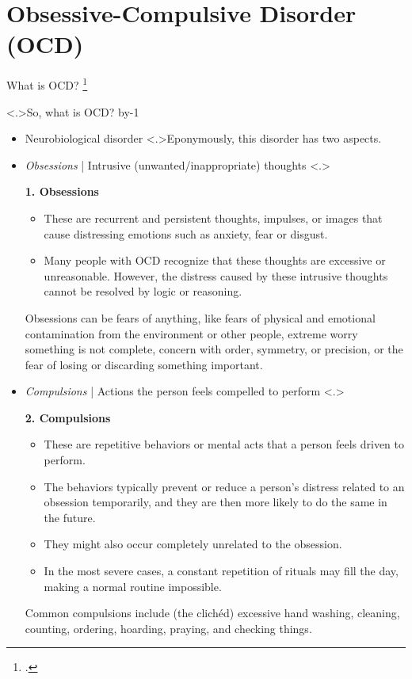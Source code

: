 \documentclass[t,aspectratio=169,xcolor=dvipsnames]{beamer}
\makeatletter
\newcommand\blfootcitetext[1]{%
  \begingroup
  \renewcommand\thefootnote{}\footcitetext{#1}%
  \addtocounter{footnote}{-1}%
  \endgroup
}
\newcommand{\trickbeamer}{\advance\beamer@slideinframe by-1}
\newcommand{\citec}[1]{\hfill\textcolor{lightgray}{\citep{#1}}}
\newcommand{\cname}[2]{\texorpdfstring{#1 \citec{#2}}{#1}}
\makeatother
\begin{document}
\section{\cname{Obsessive-Compulsive Disorder (OCD)}{abramowitz2014obsessive}}
\begin{frame}{What is OCD?}
    \blfootcitetext{abramowitz2014obsessive}
    \note<.>{So, what is OCD?}
    \trickbeamer
    \begin{itemize}
        \item<+-> Neurobiological disorder
        \note<.>{Eponymously, this disorder has two aspects.}
        
        \item<+-> \textit{Obsessions} | Intrusive (unwanted/inappropriate) thoughts
        \note<.>{\textbf{1. Obsessions}
            \begin{itemize}
                \item These are recurrent and persistent thoughts, impulses, or images that cause distressing emotions such as anxiety, fear or disgust.
                \item Many people with OCD recognize that these thoughts are excessive or unreasonable. However, the distress caused by these intrusive thoughts cannot be resolved by logic or reasoning.
            \end{itemize}
            Obsessions can be fears of anything, like fears of physical and emotional contamination from the environment or other people, extreme worry something is not complete, concern with order, symmetry, or precision, or the fear of losing or discarding something important.
        }
        
        \item<+-> \textit{Compulsions} | Actions the person feels compelled to perform
        \note<.>{\textbf{2. Compulsions}
            \begin{itemize}
                \item These are repetitive behaviors or mental acts that a person feels driven to perform. 
                \item The behaviors typically prevent or reduce a person's distress related to an obsession temporarily, and they are then more likely to do the same in the future.
                \item They might also occur completely unrelated to the obsession.
                \item In the most severe cases, a constant repetition of rituals may fill the day, making a normal routine impossible.
            \end{itemize}
            Common compulsions include (the clichéd) excessive hand washing, cleaning, counting, ordering, hoarding, praying, and checking things.
        }        
        

\end{itemize}
\end{frame}
\end{document}

